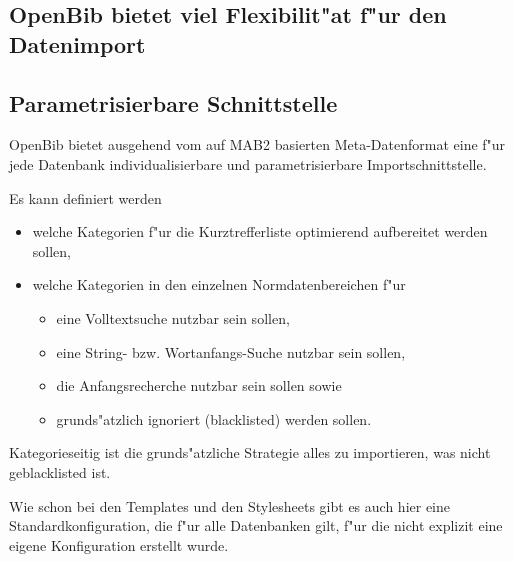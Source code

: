 \documentclass[11pt, twoside, a4paper, BCOR8mm, DIV12, bibtotoc,idxtotoc]{scrbook}
\begin{document}
\begin{itemize}
\section{OpenBib bietet viel Flexibilit"at f"ur den Datenimport }
\subsection{Parametrisierbare Schnittstelle}
OpenBib bietet ausgehend vom auf MAB2 basierten Meta-Datenformat eine
f"ur jede Datenbank individualisierbare und parametrisierbare
Importschnittstelle.

Es kann definiert werden
\begin{itemize}
\item welche Kategorien f"ur die Kurztrefferliste optimierend
  aufbereitet werden sollen,
\item welche Kategorien in den einzelnen Normdatenbereichen f"ur
  \begin{itemize}
  \item eine Volltextsuche nutzbar sein sollen,
  \item eine String- bzw. Wortanfangs-Suche nutzbar sein sollen,
  \item die Anfangsrecherche nutzbar sein sollen sowie
  \item grunds"atzlich ignoriert (blacklisted) werden sollen.
  \end{itemize}
\end{itemize}

Kategorieseitig ist die grunds"atzliche Strategie alles zu
importieren, was nicht geblacklisted ist.

Wie schon bei den Templates und den Stylesheets gibt es auch hier
eine Standardkonfiguration, die f"ur alle Datenbanken gilt, f"ur die
nicht explizit eine eigene Konfiguration erstellt wurde.


\end{itemize}
\end{document}
